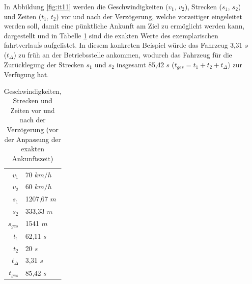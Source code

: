 In Abbildung \ref{fig:it11} werden die Geschwindigkeiten ($v_1$, $v_2$), Strecken ($s_1$, $s_2$) und Zeiten ($t_1$, $t_2$) vor und nach der Verzögerung, welche vorzeitiger eingeleitet werden soll, damit eine pünktliche Ankunft am Ziel zu ermöglicht werden kann, dargestellt und in Tabelle \ref{table:speed_fine_tuning_ex} sind die exakten Werte des exemplarischen \Gls{fahrtverlauf}s aufgelistet. In diesem konkreten Beispiel würde das Fahrzeug 3,31 $s$ ($t_{\varDelta}$) zu früh an der Betriebsstelle ankommen, wodurch das Fahrzeug für die Zurücklegung der Strecken $s_1$ und $s_2$ insgesamt 85,42 $s$ ($t_{ges}=t_1+t_2+t_{\varDelta}$) zur Verfügung hat.
\begin{table}
\begin{center}
\renewcommand{\arraystretch}{1.2}
\begin{tabular}{r l}
$v_1$                   &   70 $km/h$                     \\ 
$v_2$                   &   60 $km/h$                       \\ 
$s_1$                   &   1207,67 $m$                         \\ 
$s_2$                   &   333,33 $m$                         \\ 
$s_{ges}$                   &   1541 $m$                         \\ 
$t_1$                   &   62,11 $s$                         \\ 
$t_2$                   &   20 $s$                         \\ 
$t_{\varDelta}$                   &   3,31 $s$                         \\ 
$t_{ges}$                   &   85,42 $s$                         \\ 
\end{tabular}
\renewcommand{\arraystretch}{1}
\caption{Geschwindigkeiten, Strecken und Zeiten vor und nach der Verzögerung (vor der Anpassung der exakten Ankunftszeit)}
\label{table:speed_fine_tuning_ex}
\end{center}
\end{table}


